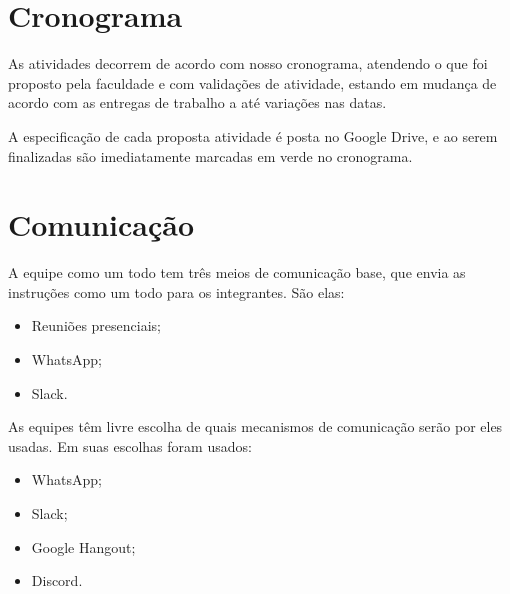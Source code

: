 \section{Cronograma}
\par As atividades decorrem de acordo com nosso cronograma, atendendo o que foi proposto pela faculdade  e com validações de atividade, estando em mudança de acordo com as entregas de trabalho a até variações nas datas.
\par A especificação de cada proposta atividade é posta no Google Drive, e ao serem finalizadas são imediatamente marcadas em verde no cronograma.
\section{Comunicação}
\par A equipe como um todo tem três meios de comunicação base, que envia as instruções como um todo para os integrantes. São elas:
\begin{itemize}
    \item Reuniões presenciais;
    \item WhatsApp;
    \item Slack.
\end{itemize}
\par As equipes têm livre escolha de quais mecanismos de comunicação serão por eles usadas. Em suas escolhas foram usados:
\begin{itemize}
    \item WhatsApp;
    \item Slack;
    \item Google Hangout;
    \item Discord.
\end{itemize}
